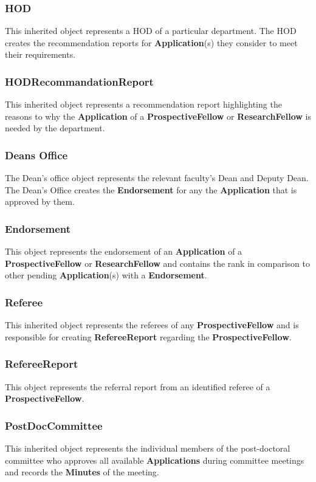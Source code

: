 \documentclass[12pt]{article}
\begin{document}
\subsubsection{HOD}
This inherited object represents a HOD of a particular department. The HOD creates the recommendation reports for \textbf{Application}(s) they consider to meet their requirements.\\

\subsubsection{HODRecommandationReport}
This inherited object represents a recommendation report highlighting the reasons to why the \textbf{Application} of a \textbf{ProspectiveFellow} or \textbf{ResearchFellow} is needed by the department.

\subsubsection{Deans Office}
The Dean's office object represents the relevant faculty's Dean and Deputy Dean. The Dean's Office creates the \textbf{Endorsement} for any the \textbf{Application} that is approved by them.

\subsubsection{Endorsement}
This object represents the endorsement of an \textbf{Application} of a \textbf{ProspectiveFellow} or \textbf{ResearchFellow} and contains the rank in comparison to other pending \textbf{Application}(s) with a \textbf{Endorsement}.

\subsubsection{Referee}
This inherited object represents the referees of any \textbf{ProspectiveFellow} and is responsible for creating \textbf{RefereeReport} regarding the \textbf{ProspectiveFellow}.

\subsubsection{RefereeReport}
This object represents the referral report from an identified referee of a \textbf{ProspectiveFellow}.

\subsubsection{PostDocCommittee}
This inherited object represents the individual members of the post-doctoral committee who approves all available \textbf{Applications} during committee meetings and records the \textbf{Minutes} of the meeting.
\end{document}
